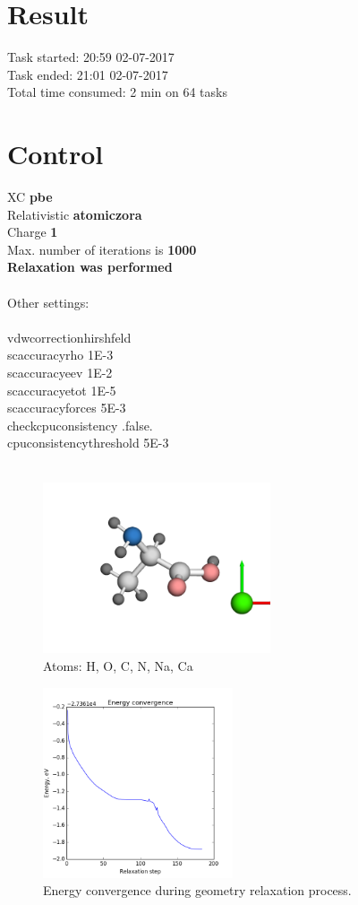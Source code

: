 \documentclass[12pt,a4paper,twocolumn]{report}
\begin{document}
\section*{Result}
Task started: \hfill 20:59 02-07-2017
\\
Task ended: \hfill 21:01 02-07-2017
\\
Total time consumed: 2 min on 64 tasks\\
\section*{Control}
XC  \hfill \textbf{pbe}\\
Relativistic  \hfill \textbf{atomic\textunderscore zora}\\
Charge  \hfill \textbf{1}\\
Max. number of iterations is \hfill \textbf{1000}\\
\textbf{Relaxation was performed\\}
\\
Other settings:\\
\\
vdw\textunderscore correction\textunderscore hirshfeld\\
sc\textunderscore accuracy\textunderscore rho    1E-3\\
sc\textunderscore accuracy\textunderscore eev    1E-2\\
sc\textunderscore accuracy\textunderscore etot   1E-5\\
sc\textunderscore accuracy\textunderscore forces 5E-3\\
check\textunderscore cpu\textunderscore consistency .false.\\
cpu\textunderscore consistency\textunderscore threshold 5E-3\\
\\
\newpage
\begin{figure}[h!]
\caption{Atoms: H, O, C, N, Na, Ca } 
\includegraphics[width=0.6\textwidth]{geometry.png}
\end{figure}
\begin{figure}[H]
\caption{Energy convergence during geometry relaxation process.} 
\includegraphics[width=0.5\textwidth]{energy_convergence.png}
\end{figure}
\end{document}
